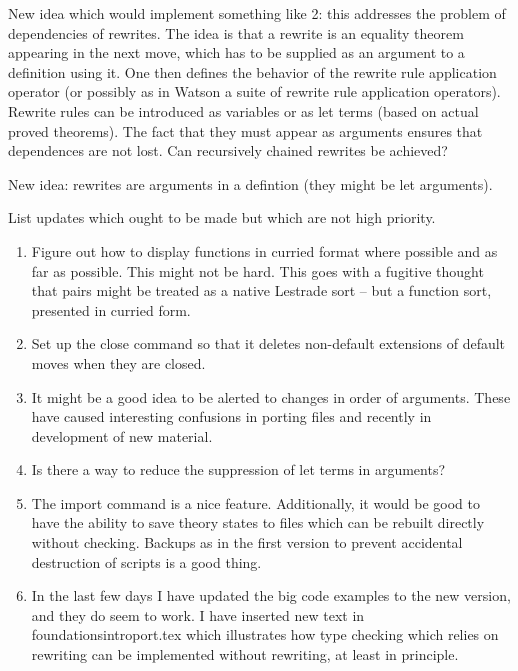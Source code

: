 \documentclass[12pt]{article}
\begin{document}
\begin{description}
New idea which would implement something like 2:  this addresses the problem of dependencies of rewrites.  The idea is that a rewrite is an equality theorem appearing
in the next move, which has to be supplied as an argument to a definition using it.   One then defines the behavior of the rewrite rule application operator (or possibly
as in Watson a suite of rewrite rule application operators).  Rewrite rules can be introduced as variables or as let terms (based on actual proved theorems).  The fact
that they must appear as arguments ensures that dependences are not lost.  Can recursively chained rewrites be achieved?

New idea:  rewrites are arguments in a defintion (they might be let arguments).

\item[4/15/2020:]  List updates which ought to be made but which are not high priority.

\begin{enumerate}

\item Figure out how to display functions in curried format where possible and as far as possible.  This might not be hard.  This goes with a fugitive thought that pairs
might be treated as a native Lestrade sort -- but a function sort, presented in curried form.



\item Set up the close command so that it deletes non-default extensions of default moves when they are closed.

\item It might be a good idea to be alerted to changes in order of arguments.  These have caused interesting confusions in porting files and recently in development of new material.

\item Is there a way to reduce the suppression of let terms in arguments?

\item The import command is a nice feature.  Additionally, it would be good to have the ability to save theory states to files which can be rebuilt directly without checking.  Backups as in the first version to prevent accidental destruction of scripts is a good thing.

\item In the last few days I have updated the big code examples to the new version, and they do seem to work.   I have inserted new text in foundationsintroport.tex which illustrates
how type checking which relies on rewriting can be implemented without rewriting, at least in principle.


\end{enumerate}
\end{description}
\end{document}
